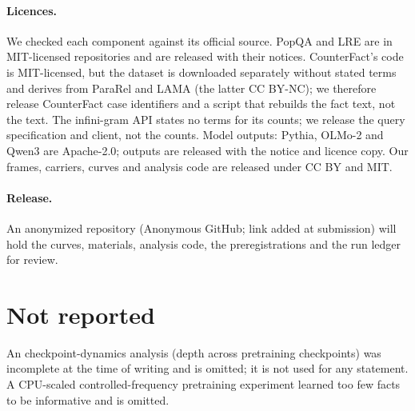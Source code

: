 \paragraph{Licences.}
We checked each component against its official source.
PopQA and LRE are in MIT-licensed repositories and are released with their notices.
CounterFact's code is MIT-licensed, but the dataset is downloaded separately without stated terms and derives from ParaRel and LAMA (the latter CC BY-NC); we therefore release CounterFact case identifiers and a script that rebuilds the fact text, not the text.
The infini-gram API states no terms for its counts; we release the query specification and client, not the counts.
Model outputs: Pythia, OLMo-2 and Qwen3 are Apache-2.0; \llama{} outputs are released with the \LlamaLic{} notice and licence copy.
Our frames, carriers, curves and analysis code are released under CC BY and MIT.
\paragraph{Release.}
An anonymized repository (Anonymous GitHub; link added at submission) will hold the curves, materials, analysis code, the preregistrations and the run ledger for review.

\FloatBarrier
\section{Not reported}
An \expl checkpoint-dynamics analysis (depth across pretraining checkpoints) was incomplete at the time of writing and is omitted; it is not used for any statement.
A CPU-scaled controlled-frequency pretraining experiment learned too few facts to be informative and is omitted.
